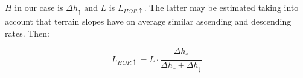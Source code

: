 \documentclass[12pt]{article}
\begin{document}
$H$ in our case is $\Delta h_{\uparrow}$ and $L$ is $L_{HOR\uparrow}$. The latter may be estimated taking into account that terrain slopes have on average similar ascending and descending rates. Then:

\begin{equation}
L_{HOR\uparrow} = L \cdot \frac{\Delta h_{\uparrow}}{\Delta h_{\uparrow} + \Delta h_{\downarrow}}
\end{equation}

\newpage
\appendix


\end{document}
